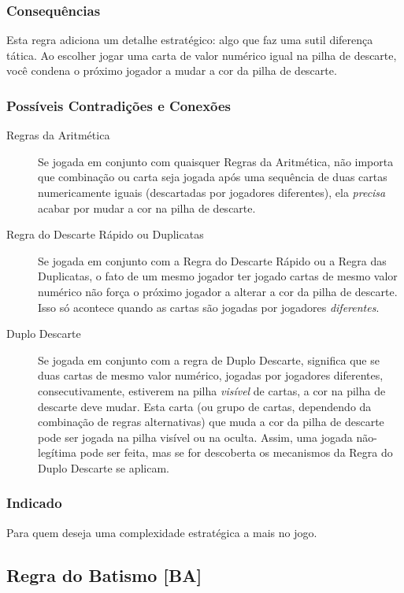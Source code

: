\subsubsection{Consequências} 

Esta regra adiciona um detalhe estratégico: algo que faz uma sutil diferença tática. Ao escolher jogar uma carta de valor numérico igual na pilha de descarte, você condena o próximo jogador a mudar a cor da pilha de descarte. 

\subsubsection{Possíveis Contradições e Conexões}

\begin{description}
\item[Regras da Aritmética]{Se jogada em conjunto com quaisquer Regras da Aritmética, não importa que combinação ou carta seja jogada após uma sequência de duas cartas numericamente iguais (descartadas por jogadores diferentes), ela \emph{precisa} acabar por mudar a cor na pilha de descarte.}
\item[Regra do Descarte Rápido ou Duplicatas]{Se jogada em conjunto com a Regra do Descarte Rápido ou a Regra das Duplicatas, o fato de um mesmo jogador ter jogado cartas de mesmo valor numérico não força o próximo jogador a alterar a cor da pilha de descarte. Isso só acontece quando as cartas são jogadas por jogadores \emph{diferentes}.}
\item[Duplo Descarte]{Se jogada em conjunto com a regra de Duplo Descarte, significa que se duas cartas de mesmo valor numérico, jogadas por jogadores diferentes, consecutivamente, estiverem na pilha \emph{visível} de cartas, a cor na pilha de descarte deve mudar. Esta carta (ou grupo de cartas, dependendo da combinação de regras alternativas) que muda a cor da pilha de descarte pode ser jogada na pilha visível ou na oculta. Assim, uma jogada não-legítima pode ser feita, mas se for descoberta os mecanismos da Regra do Duplo Descarte se aplicam.}
\end{description}

\subsubsection{Indicado} 

Para quem deseja uma complexidade estratégica a mais no jogo.

\subsection{Regra do Batismo [BA]}

